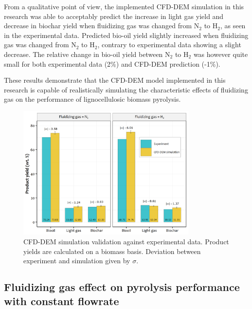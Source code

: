 From a qualitative point of view, the implemented CFD-DEM simulation in this research was able to acceptably predict the increase in light gas yield and decrease in biochar yield when fluidizing gas was changed from N$_2$ to H$_2$, as seen in the experimental data. Predicted bio-oil yield slightly increased when fluidizing gas was changed from N$_2$ to H$_2$, contrary to experimental data showing a slight decrease. The relative change in bio-oil yield between N$_2$ to H$_2$ was however quite small for both experimental data (2\%) and CFD-DEM prediction (-1\%).

These results demonstrate that the CFD-DEM model implemented in this research is capable of realistically simulating the characteristic effects of fluidizing gas on the performance of lignocellulosic biomass pyrolysis.

\begin{figure}[H]
    \centering
    \includegraphics[width=0.8\textwidth]{figures/cfd-validation.png}
    \caption{CFD-DEM simulation validation against experimental data. Product yields are calculated on a biomass basis. Deviation between experiment and simulation given by $\sigma$.}
    \label{fig:cfd-validation}
\end{figure}


\subsection{Fluidizing gas effect on pyrolysis performance with constant flowrate}

